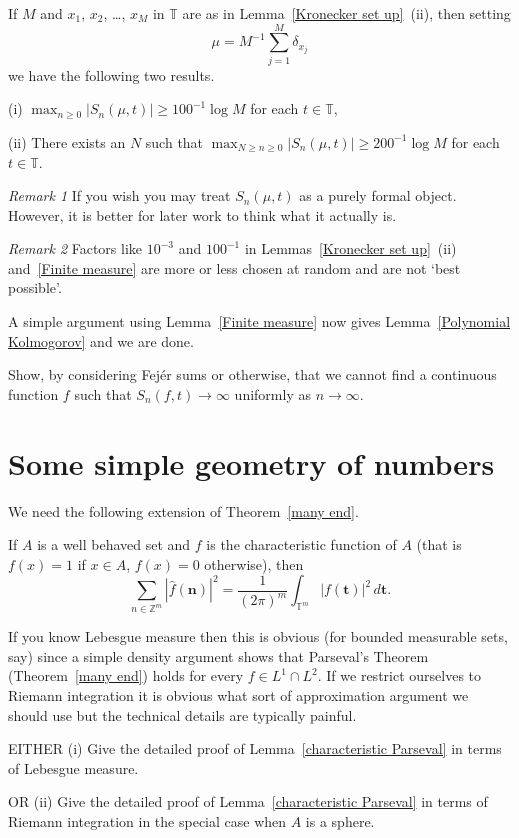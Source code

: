 \begin{lemma}\label{Finite measure} If $M$ and
$x_{1}$, $x_{2}$, \dots, $x_{M}$ in ${\mathbb T}$
are as in Lemma~\ref{Kronecker set up}~(ii),
then setting
\[\mu=M^{-1}\sum_{j=1}^{M}\delta_{x_{j}}\]
we have the following two results.

(i) $\max_{n\geq 0}|S_{n}(\mu,t)|\geq 100^{-1}\log M$
for each $t\in{\mathbb T}$,

(ii) There exists an $N$ such that
$\max_{N\geq n\geq 0}|S_{n}(\mu,t)|\geq 200^{-1}\log M$
for each $t\in{\mathbb T}$.
\end{lemma}

\noindent\emph{Remark 1} If you wish you may treat
$S_{n}(\mu,t)$ as a purely formal object. However,
it is better for later work to think what it actually is.

\noindent\emph{Remark 2} Factors like $10^{-3}$ and $100^{-1}$
in Lemmas~\ref{Kronecker set up}~(ii) and~\ref{Finite measure}
are more or less chosen at random and are not `best possible'.

A simple argument using Lemma~\ref{Finite measure} now gives
Lemma~\ref{Polynomial Kolmogorov} and we are done.
\begin{exercise} Show, by considering
Fej\'{e}r sums or otherwise, that we cannot find a continuous
function $f$ such that $S_{n}(f,t)\rightarrow\infty$
uniformly as $n\rightarrow\infty$.
\end{exercise}

\section{Some simple geometry of numbers}
We need the following
extension of Theorem~\ref{many end}.
\begin{lemma}\label{characteristic Parseval}
If $A$ is a well behaved set
and $f$ is the characteristic function
of $A$ (that is $f(x)=1$ if $x\in A$,
$f(x)=0$ otherwise), then
\[\sum_{n\in{\mathbb Z}^{m}}|\hat{f}({\mathbf n})|^{2}
=\frac{1}{(2\pi)^{m}}\int_{{\mathbb T}^{m}}
|f({\mathbf t})|^{2}\,d{\mathbf t}.\]
\end{lemma}
If you know Lebesgue measure then this is
obvious (for bounded measurable sets, say)
since a simple density argument shows that
Parseval's Theorem (Theorem~\ref{many end})
holds for every $f\in L^{1}\cap L^{2}$.
If we restrict ourselves to Riemann integration
it is obvious what sort of approximation
argument we should use but the technical details
are typically painful.
\begin{exercise} EITHER (i) Give the detailed
proof of Lemma~\ref{characteristic Parseval}
in terms of Lebesgue measure.

OR (ii) Give the detailed
proof of Lemma~\ref{characteristic Parseval}
in terms of Riemann integration in the
special case when $A$ is a sphere.
\end{exercise}

